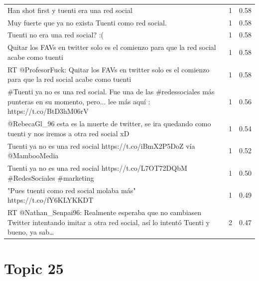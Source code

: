 \begin{longtable}{p{12.5cm}rr}
Han shot first y tuenti era una red social & 1 & 0.58 \\
Muy fuerte que ya no exista Tuenti como red social. & 1 & 0.58 \\
Tuenti no era una red social? :( & 1 & 0.58 \\
Quitar los FAVs en twitter solo es el comienzo para que la red social acabe como tuenti & 1 & 0.58 \\
RT @ProfesorFuck: Quitar los FAVs en twitter solo es el comienzo para que la red social acabe como tuenti & 1 & 0.58 \\
\#Tuenti ya no es una red social. Fue una de las \#redessociales más punteras en su momento, pero... lee más aquí : https://t.co/BtD3hM06rV & 1 & 0.56 \\
@RebecaGl\_96 esta es la muerte de twitter, se ira quedando como tuenti y nos iremos a otra red social xD & 1 & 0.54 \\
Tuenti ya no es una red social https://t.co/iBmX2P5DoZ vía @MambooMedia & 1 & 0.52 \\
Tuenti ya no es una red social https://t.co/L7OT72DQbM \#RedesSociales \#marketing & 1 & 0.50 \\
"Pues tuenti como red social molaba más" https://t.co/fY6KLYKKDT & 1 & 0.49 \\
RT @Nathan\_Senpai96: Realmente esperaba que no cambiasen Twitter intentando imitar a otra red social, así lo intentó Tuenti y bueno, ya sab… & 2 & 0.47 \\

\end{longtable}
\clearpage

\section{Topic 25}

